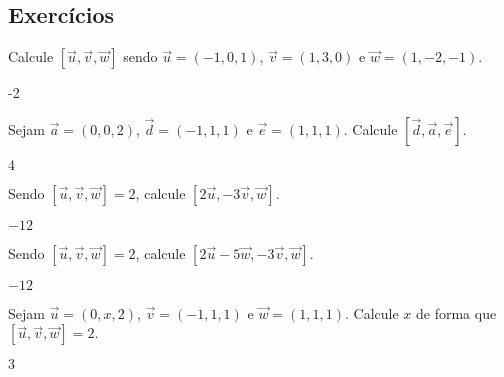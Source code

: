 \subsection*{Exercícios}

\begin{exer}
  Calcule $[\vec{u},\vec{v},\vec{w}]$ sendo $\vec{u}=(-1,0,1)$, $\vec{v}=(1,3,0)$ e $\vec{w}=(1,-2,-1)$.
\end{exer}
\begin{resp}
  -2
\end{resp}

\begin{exer}
  Sejam $\vec{a}=(0,0,2)$, $\vec{d}=(-1,1,1)$ e $\vec{e}=(1,1,1)$. Calcule $[\vec{d},\vec{a},\vec{e}]$.
\end{exer}
\begin{resp}
  $4$
\end{resp}

\begin{exer}
  Sendo $[\vec{u},\vec{v},\vec{w}]=2$, calcule $[2\vec{u},-3\vec{v},\vec{w}]$.
\end{exer}
\begin{resp}
  $-12$
\end{resp}

\begin{exer}
  Sendo $[\vec{u},\vec{v},\vec{w}]=2$, calcule $[2\vec{u}-5\vec{w},-3\vec{v},\vec{w}]$.
\end{exer}
\begin{resp}
  $-12$
\end{resp}

\begin{exer}
  Sejam $\vec{u}=(0,x,2)$, $\vec{v}=(-1,1,1)$ e $\vec{w}=(1,1,1)$. Calcule $x$ de forma que $[\vec{u},\vec{v},\vec{w}]=2$.
\end{exer}
\begin{resp}
  $3$
\end{resp}

